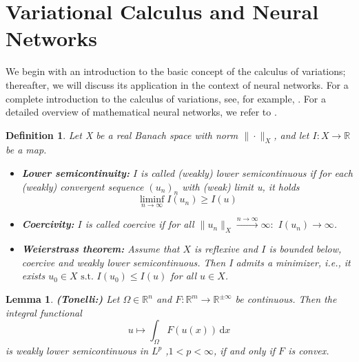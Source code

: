 \documentclass[12pt,openany]{book}
\newcommand{\R}{\mathbb{R}}
\theoremstyle{plainnormal}
\newtheorem{lemma}[theorem]{Lemma}
\newtheorem{definition}[theorem]{Definition}
\theoremstyle{remark}
\begin{document}
\section{Variational Calculus and Neural Networks}
We begin with an introduction to the basic concept of the calculus of variations; thereafter, we will discuss its application in the context of neural networks. For a complete introduction to the calculus of variations, see, for example, \cite{Dacorogna}. For a detailed overview of mathematical neural networks, we refer to \cite{e2020mathematicalunderstandingneuralnetworkbased}.
\begin{definition}
Let X be a real Banach space with norm $\|\cdot\|_X$, and let $I: X\rightarrow\R$ be a map.
\begin{itemize}
    \item \textbf{Lower semicontinuity:} $I$ is called (weakly) \emph{lower semicontinuous} if for each (weakly) convergent sequence $(u_n)_n$ with (weak) limit u, it holds
\[\liminf_{n \to \infty} I (u_n) \geq I(u)\]
    \item \textbf{Coercivity:} $I$ is called \emph{coercive} if for all $\|u_n\|_X\xrightarrow{n\rightarrow\infty} \infty:$ $ I(u_n) \rightarrow \infty$.
    \item \textbf{Weierstrass theorem:} Assume that $X$ is reflexive and $I$ is bounded below, coercive and weakly lower semicontinuous. Then I admits a minimizer, i.e., it exists $u_0 \in X \text{ s.t. } I(u_0) \leq I(u)$ for all $ u \in X$.
    \label{Weierstrass}
\end{itemize}
    
\end{definition}
\begin{lemma}\label{thm:Tonelli}\textbf{(Tonelli:)}
    Let $\Omega \in \R^n$ and $F:\R^m\rightarrow\R^{\pm\infty}$ be continuous. Then the integral functional $$u \mapsto \int_\Omega F(u(x))\,\mathrm{d}x$$
    is weakly lower semicontinuous in $L^p$ ,$1<p<\infty$, if and only if $F$ is convex.
\end{lemma}
\end{document}
